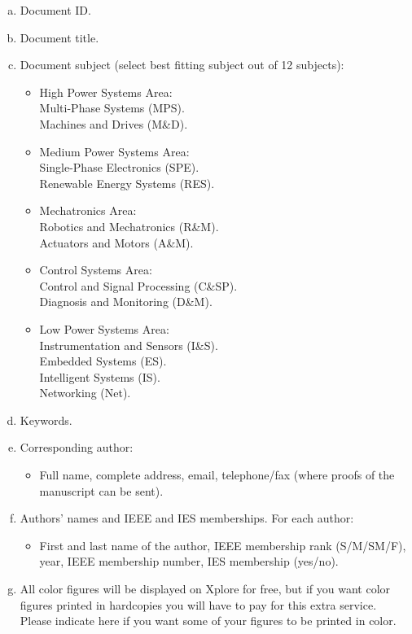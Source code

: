 \documentclass[journal]{IEEEtranTIE}
\begin{document}
\begin{enumerate}[1)]
	\begin{enumerate}[a.]
		\item Document ID.
		\item Document title.
		\item Document subject (select best fitting subject out of 12 subjects):
			\begin{itemize}
			\item High Power Systems Area:
			\\Multi-Phase Systems (MPS).
			\\Machines and Drives (M\&D).
			\item Medium Power Systems Area:
			\\Single-Phase Electronics (SPE).
			\\Renewable Energy Systems (RES).
			\item Mechatronics Area:
			\\Robotics and Mechatronics (R\&M).
			\\Actuators and Motors (A\&M).
			\item Control Systems Area:
			\\Control and Signal Processing (C\&SP).
			\\Diagnosis and Monitoring (D\&M).
			\item Low Power Systems Area:
			\\Instrumentation and Sensors (I\&S).
			\\Embedded Systems (ES).
			\\Intelligent Systems (IS).
			\\Networking (Net).
			\end{itemize}
		\item Keywords.
		\item Corresponding author:
		\begin{itemize}
			\item Full name, complete address, email, telephone/fax (where proofs of the manuscript can be sent).
		\end{itemize}
		\item Authors' names and IEEE and IES memberships. For each author:
		\begin{itemize}
			\item First and last name of the author, IEEE membership rank (S/M/SM/F), year, IEEE membership number, IES membership (yes/no).
		\end{itemize}
		\item All color figures will be displayed on Xplore for free, but if you want color figures printed in hardcopies you will have to pay for this extra service. Please indicate here if you want some of your figures to be printed in color.
	\end{enumerate}
\end{enumerate}
\end{document}
